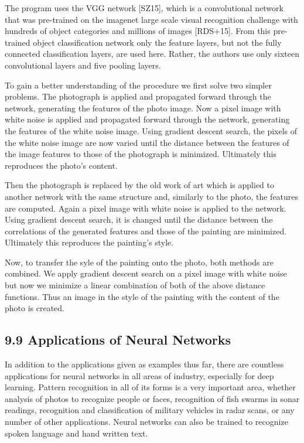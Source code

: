 \documentclass[10pt]{book}
\begin{document}
\begin{center}
\begin{enumerate}
\begin{center}
\begin{center}
\begin{center}
The program uses the VGG network [SZ15], which is a convolutional network that was pre-trained on the imagenet large scale visual recognition challenge with hundreds of object categories and millions of images [RDS+15]. From this pre-trained object classification network only the feature layers, but not the fully connected classification layers, are used here. Rather, the authors use only sixteen convolutional layers and five pooling layers.

To gain a better understanding of the procedure we first solve two simpler problems. The photograph is applied and propagated forward through the network, generating the features of the photo image. Now a pixel image with white noise is applied and propagated forward through the network, generating the features of the white noise image. Using gradient descent search, the pixels of the white noise image are now varied until the distance between the features of the image features to those of the photograph is minimized. Ultimately this reproduces the photo's content.

Then the photograph is replaced by the old work of art which is applied to another network with the same structure and, similarly to the photo, the features are computed. Again a pixel image with white noise is applied to the network. Using gradient descent search, it is changed until the distance between the correlations of the generated features and those of the painting are minimized. Ultimately this reproduces the painting's style.

Now, to transfer the syle of the painting onto the photo, both methods are combined. We apply gradient descent search on a pixel image with white noise but now we minimize a linear combination of both of the above distance functions. Thus an image in the style of the painting with the content of the photo is created.

\subsection*{9.9 Applications of Neural Networks}
In addition to the applications given as examples thus far, there are countless applications for neural networks in all areas of industry, especially for deep learning. Pattern recognition in all of its forms is a very important area, whether analysis of photos to recognize people or faces, recognition of fish swarms in sonar readings, recognition and classification of military vehicles in radar scans, or any number of other applications. Neural networks can also be trained to recognize spoken language and hand written text.


\end{center}
\end{center}
\end{center}
\end{enumerate}
\end{center}
\end{document}
